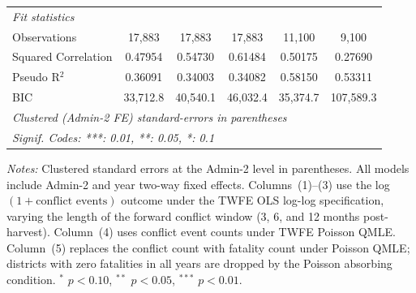 \begin{tabular}{lccccc}
   \midrule
   \emph{Fit statistics}\\
   Observations            & 17,883                    & 17,883                    & 17,883                     & 11,100                    & 9,100\\  
   Squared Correlation     & 0.47954                   & 0.54730                   & 0.61484                    & 0.50175                   & 0.27690\\  
   Pseudo R$^2$            & 0.36091                   & 0.34003                   & 0.34082                    & 0.58150                   & 0.53311\\  
   BIC                     & 33,712.8                  & 40,540.1                  & 46,032.4                   & 35,374.7                  & 107,589.3\\  
   \midrule \midrule
   \multicolumn{6}{l}{\emph{Clustered (Admin-2 FE) standard-errors in parentheses}}\\
   \multicolumn{6}{l}{\emph{Signif. Codes: ***: 0.01, **: 0.05, *: 0.1}}\\
\end{tabular}
 
\par \raggedright 
\textit{Notes:} Clustered standard errors at the Admin-2 level in parentheses. All models include Admin-2 and year two-way fixed effects. Columns~(1)--(3) use the log$(1+\text{conflict events})$ outcome under the TWFE OLS log-log specification, varying the length of the forward conflict window (3, 6, and 12 months post-harvest). Column~(4) uses conflict event counts under TWFE Poisson QMLE. Column~(5) replaces the conflict count with fatality count under Poisson QMLE; districts with zero fatalities in all years are dropped by the Poisson absorbing condition. $^{*}$ $p<0.10$, $^{**}$ $p<0.05$, $^{***}$ $p<0.01$.
\par\endgroup


